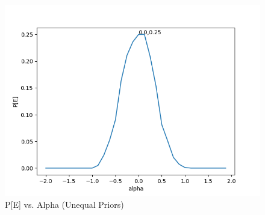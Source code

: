 \documentclass{article}
\begin{document}
\begin{figure}[!htb]
	\begin{minipage}{0.99\textwidth}
		\centering
		\includegraphics[width=1\linewidth]{../unequalpriors/results.png}
		\caption{P[E] vs. Alpha (Unequal Priors)}
	\end{minipage}
\end{figure}
\clearpage
\pagebreak
\end{document}
